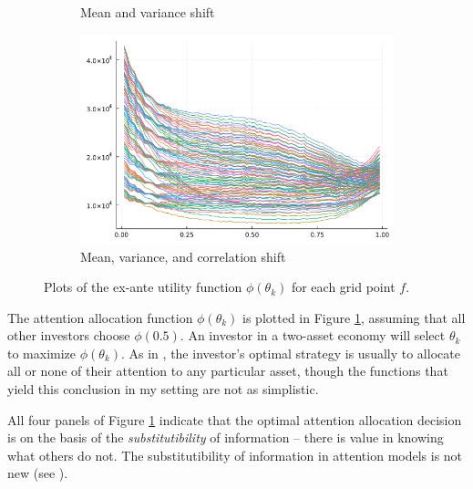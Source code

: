 \documentclass{article}
\begin{document}
\begin{figure}
\begin{subfigure}{0.45\textwidth}
        \caption{Mean and variance shift}
    \end{subfigure}
    \begin{subfigure}{0.45\textwidth}
        \includegraphics[width=\textwidth]{../plots/params/more-corr-meanvarshift/optimality_functions.png}
        \caption{Mean, variance, and correlation shift}
    \end{subfigure}
    \caption{Plots of the ex-ante utility function $\phi(\theta_k)$ for each grid point $f$.}
    \label{fig:optimality_functions}
\end{figure}

The attention allocation function $\phi(\theta_k)$ is plotted in Figure \ref{fig:optimality_functions}, assuming that all other investors choose $\phi(0.5)$. An investor in a two-asset economy will select $\theta_k$ to maximize $\phi(\theta_k)$. As in \textcite{kacperczyk_rational_2016}, the investor's optimal strategy is usually to allocate all or none of their attention to any particular asset, though the functions that yield this conclusion in my setting are not as simplistic. 

All four panels of Figure \ref{fig:optimality_functions} indicate that the optimal attention allocation decision is on the basis of the \textit{substitutibility} of information -- there is value in knowing what others do not. The substitutibility of information in attention models is not new (see \textcite{van_nieuwerburgh_information_2010}).
\end{document}
